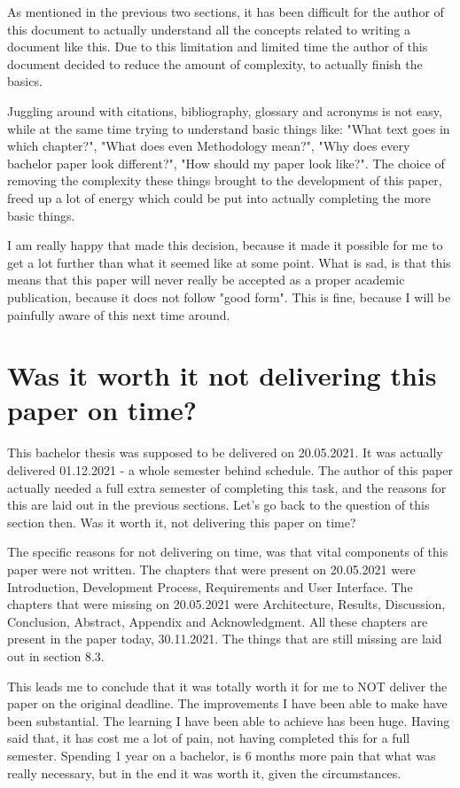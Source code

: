 As mentioned in the previous two sections, it has been difficult for the author of this document to actually understand all the concepts related to writing a document like this. Due to this limitation and limited time the author of this document decided to reduce the amount of complexity, to actually finish the basics.

Juggling around with citations, bibliography, glossary and acronyms is not easy, while at the same time trying to understand basic things like: "What text goes in which chapter?", "What does even Methodology mean?", "Why does every bachelor paper look different?", "How should my paper look like?". The choice of removing the complexity these things brought to the development of this paper, freed up a lot of energy which could be put into actually completing the more basic things.

I am really happy that made this decision, because it made it possible for me to get a lot further than what it seemed like at some point. What is sad, is that this means that this paper will never really be accepted as a proper academic publication, because it does not follow "good form". This is fine, because I will be painfully aware of this next time around.



\section{Was it worth it not delivering this paper on time?}

This bachelor thesis was supposed to be delivered on 20.05.2021. It was actually delivered 01.12.2021 - a whole semester behind schedule. The author of this paper actually needed a full extra semester of completing this task, and the reasons for this are laid out in the previous sections. Let's go back to the question of this section then. Was it worth it, not delivering this paper on time?

The specific reasons for not delivering on time, was that vital components of this paper were not written. The chapters that were present on 20.05.2021 were Introduction, Development Process, Requirements and User Interface. The chapters that were missing on 20.05.2021 were Architecture, Results, Discussion, Conclusion, Abstract, Appendix and Acknowledgment. All these chapters are present in the paper today, 30.11.2021. The things that are still missing are laid out in section 8.3.

This leads me to conclude that it was totally worth it for me to NOT deliver the paper on the original deadline. The improvements I have been able to make have been substantial. The learning I have been able to achieve has been huge. Having said that, it has cost me a lot of pain, not having completed this for a full semester. Spending 1 year on a bachelor, is 6 months more pain that what was really necessary, but in the end it was worth it, given the circumstances.

